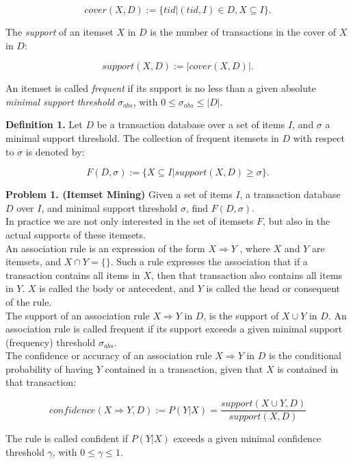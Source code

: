 \documentclass{article}
\begin{document}
\[cover(X, D) := \{tid | (tid, I) \in D, X \subseteq I\}. \]

The {\sl support} of an itemset $X$ in $D$ is the number of transactions in the cover of $X$ in $D$:

\[support(X, D) := |cover(X,D)|.\]

An itemset is called {\sl frequent} if its support is no less than a given absolute {\sl minimal support threshold $\sigma_{abs}$}, with  $0 \le \sigma_{abs} \le |D|$.

{\bf Definition 1.} Let $D$ be a transaction database over a set of items $I$, and $\sigma$ a minimal support threshold. The collection of frequent itemsets in $D$ with respect to $\sigma$ is denoted by: 

\[F(D,\sigma) := \{X \subseteq I | support(X, D) \ge \sigma\}.\]

{\bf Problem 1. (Itemset Mining)} Given a set of items $I$, a transaction database $D$ over $I$, and minimal support threshold $\sigma$, find $F(D, \sigma)$.\\

In practice we are not only interested in the set of itemsets $F$, but also
in the actual supports of these itemsets.\\

An association rule is an expression of the form $X \Rightarrow Y$ ,
where $X$ and $Y$ are itemsets, and $X \cap Y = \{\}$. Such a rule
expresses the association that if a transaction contains all items in
$X$, then that transaction also contains all items in $Y$. $X$ is called
the body or antecedent, and $Y$ is called the head or consequent of the
rule.\\

The support of an association rule $X \Rightarrow Y$ in $D$, is the
support of $X \cup Y$ in $D$. An association rule is called
frequent if its support exceeds a given minimal support
(frequency) threshold $\sigma_{abs}$. \\

The confidence or accuracy of an association rule $X \Rightarrow Y$ in
$D$ is the conditional probability of having $Y$ contained in a
transaction, given that $X$ is contained in that transaction:

\[confidence(X \Rightarrow Y, D) := P(Y|X) = \frac{support(X \cup Y, D)}{support(X,D)}\]

The rule is called confident if $P(Y|X)$ exceeds a given minimal confidence threshold $\gamma$, with $0 \le \gamma \le 1$. \\
\end{document}
